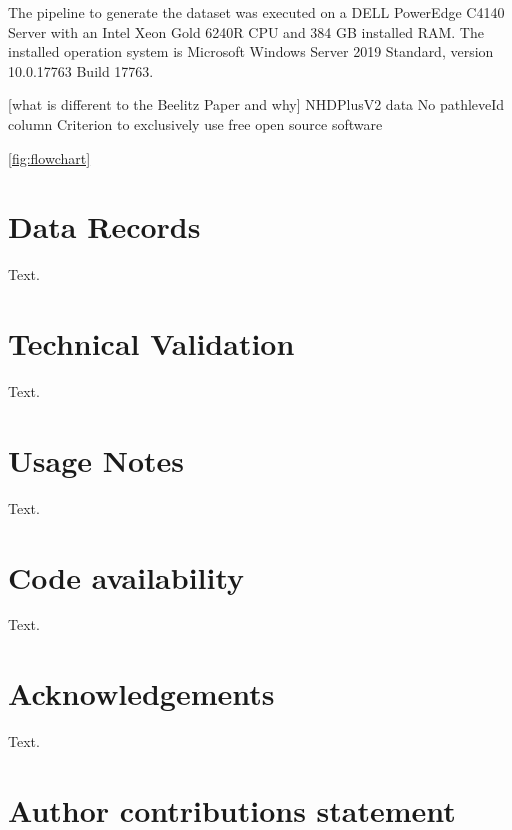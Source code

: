 \documentclass[fleqn,10pt]{wlscirep}
\begin{document}
The pipeline to generate the dataset was executed on a DELL PowerEdge C4140 Server with an Intel Xeon Gold 6240R CPU and 384 GB installed RAM. The installed operation system is Microsoft Windows Server 2019 Standard, version 10.0.17763 Build 17763.

{[}what is different to the Beelitz Paper and why{]}
NHDPlusV2 data
No pathleveId column
Criterion to exclusively use free open source software

\ref{fig:flowchart}

\hypertarget{data-records}{%
\section*{Data Records}\label{data-records}}

Text.

\hypertarget{technical-validation}{%
\section*{Technical Validation}\label{technical-validation}}

Text.

\hypertarget{usage-notes}{%
\section*{Usage Notes}\label{usage-notes}}

Text.

\hypertarget{code-availability}{%
\section*{Code availability}\label{code-availability}}

Text.

\hypertarget{acknowledgements}{%
\section*{Acknowledgements}\label{acknowledgements}}

Text.

\hypertarget{author-contributions-statement}{%
\section*{Author contributions statement}\label{author-contributions-statement}}
\end{document}
